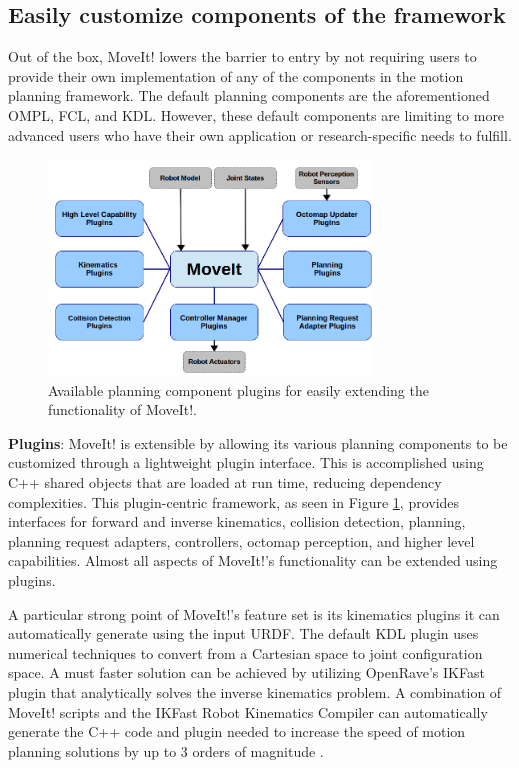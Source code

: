 \documentclass[10pt,journal,compsoc]{joser1}
\begin{document}
{%
\subsection{Easily customize components of the framework}
\label{subsec:extensiblity}

Out of the box, MoveIt! lowers the barrier to entry by not requiring users to provide their own implementation of any of the components in the motion planning framework. The default planning components are the aforementioned OMPL, FCL, and KDL. However, these default components are limiting to more advanced users who have their own application or research-specific needs to fulfill. 

\begin{figure}[!t]
\centering
\includegraphics[width=3.4in]{images/moveit_plugins}
\caption{Available planning component plugins for easily extending the functionality of MoveIt!.}
\label{fig:moveit_plugins}
\end{figure}

{\bf Plugins}: MoveIt! is extensible by allowing its various planning components to be customized through a lightweight plugin interface. This is accomplished using C++ shared objects that are loaded at run time, reducing dependency complexities. This plugin-centric framework, as seen in Figure \ref{fig:moveit_plugins}, provides interfaces for forward and inverse kinematics, collision detection, planning, planning request adapters, controllers, octomap perception, and higher level capabilities. Almost all aspects of MoveIt!'s functionality can be extended using plugins.

A particular strong point of MoveIt!'s feature set is its kinematics plugins it can automatically generate using the input URDF. The default KDL plugin uses numerical techniques to convert from a Cartesian space to joint configuration space. A must faster solution can be achieved by utilizing OpenRave's IKFast \cite{ikfast} plugin that analytically solves the inverse kinematics problem. A combination of MoveIt! scripts and the IKFast Robot Kinematics Compiler can automatically generate the C++ code and plugin needed to increase the speed of motion planning solutions by up to 3 orders of magnitude \cite{ikfast}.

}
\end{document}
